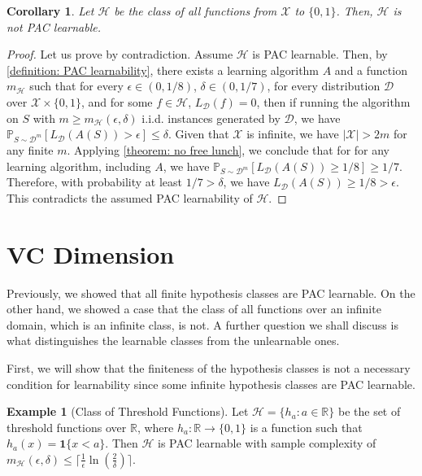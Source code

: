 \documentclass[openany, amssymb, psamsfonts]{amsart}
\newtheorem{cor}{Corollary}[section]
\theoremstyle{definition}
\newtheorem{exmp}{Example}[section]
\numberwithin{equation}{section}
\begin{document}
\begin{cor}
Let $\mathcal{H}$ be the class of all functions from $\mathcal{X}$ to $\{0, 1\}$. Then, $\mathcal{H}$ is not PAC learnable.
\end{cor}

\begin{proof}
Let us prove by contradiction. Assume $\mathcal{H}$ is PAC learnable. Then, by \autoref{definition: PAC learnability}, there exists a learning algorithm $A$ and a function $m_{\mathcal{H}}$ such that for every $\epsilon \in (0,1/8)$, $\delta \in (0, 1/7)$, for every distribution $\mathcal{D}$ over $\mathcal{X} \times \{0, 1\}$, and for some $f \in \mathcal{H}$, $L_{\mathcal{D}}(f)=0$, then if running the algorithm on $S$ with $m \geq m_{\mathcal{H}}(\epsilon, \delta)$ i.i.d. instances generated by $\mathcal{D}$, we have $\mathbb{P}_{S \sim \mathcal{D}^m}[L_{\mathcal{D}}(A(S))>\epsilon] \leq \delta$. Given that $\mathcal{X}$ is infinite, we have $|\mathcal{X}| > 2m$ for any finite $m$. Applying \autoref{theorem: no free lunch}, we conclude that for for any learning algorithm, including $A$, we have $\mathbb{P}_{S \sim \mathcal{D}^m}[L_\mathcal{D}(A(S)) \geq 1/8] \geq 1/7$. Therefore, with probability at least $1/7 > \delta$, we have $L_{\mathcal{D}}(A(S)) \geq 1/8 > \epsilon$. This contradicts the assumed PAC learnability of $\mathcal{H}$.
\end{proof}

\section{VC Dimension}

Previously, we showed that all finite hypothesis classes are PAC learnable. On the other hand, we showed a case that the class of all functions over an infinite domain, which is an infinite class, is not. A further question we shall discuss is what distinguishes the learnable classes from the unlearnable ones.

First, we will show that the finiteness of the hypothesis classes is not a necessary condition for learnability since some infinite hypothesis classes are PAC learnable.

\begin{exmp}[Class of Threshold Functions] \label{example: infinite class learnable}
  Let $\mathcal{H} = \{h_a \colon a \in \mathbb{R}\}$ be the set of threshold functions over $\mathbb{R}$, where $h_a \colon \mathbb{R} \to \{0, 1\}$ is a function such that $h_a(x) = \mathbf{1}\{x<a\}$. Then $\mathcal{H}$ is PAC learnable with sample complexity of $m_{\mathcal{H}}(\epsilon,\delta) \leq \lceil \frac{1}{\epsilon}\ln\left(\frac{2}{\delta}\right) \rceil$.
\end{exmp}
\end{document}
